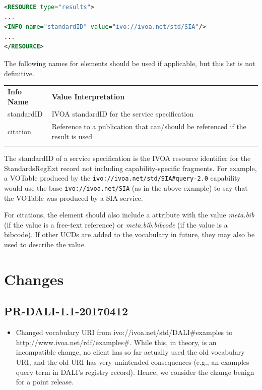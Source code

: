 \documentclass[11pt,letter]{ivoa}
\begin{document}
\begin{lstlisting}[language=XML]
<RESOURCE type="results">
...
<INFO name="standardID" value="ivo://ivoa.net/std/SIA"/>
...
</RESOURCE>
\end{lstlisting}

The following names for  elements should be used if applicable, but this 
list is not definitive.

\begin{tabular}{l p{8cm}}
\sptablerule
\textbf{Info Name}&\textbf{Value Interpretation}\\
\sptablerule
standardID & IVOA standardID for the service specification \\
citation & Reference to a publication that can/should be referenced if the 
result is used \\
\sptablerule
\end{tabular}

The standardID of a service specification is the IVOA resource identifier for 
the StandardsRegExt record not including capability-specific fragments. For example, 
a VOTable produced by the \verb|ivo://ivoa.net/std/SIA#query-2.0| capability 
would use the base \verb|ivo://ivoa.net/SIA| (as in the above example) to say that 
the VOTable was produced by a SIA service.

For citations, the  element should also include a
 attribute with the 
value \emph{meta.bib} (if the value is a free-text reference) or
\emph{meta.bib.bibcode} (if 
the value is a bibcode). If other  UCDs are added to the vocabulary in 
future, they may also be used to describe the value.

\appendix

\section{Changes}

\subsection{PR-DALI-1.1-20170412}

\begin{itemize}
\item Changed vocabulary URI from ivo://ivoa.net/std/DALI\#examples to
http://www.ivoa.net/rdf/examples\#.  While this, in theory, is an
incompatible change, no client has so far actually used the old vocabulary
URI, and the old URI has very unintended consequences (e.g., an
examples query term in DALI's registry record).  Hence, we consider the
change benign for a point release.
\end{itemize}
\end{document}
